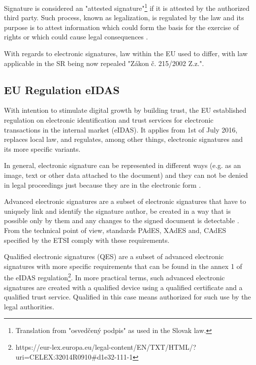 \documentclass[thesismargins, english, thesislinespacing, twoside, openright, upjsfrontpage]{rnthesis}
\begin{document}
Signature is considered an "attested signature"\footnote{Translation from "osvedčený podpis" as used in the Slovak law.} if it is attested by the authorized third party.
Such process, known as legalization, is regulated by the law and its purpose is to attest information which could form the basis for the exercise of rights or which could cause legal consequences \cite{3}.

With regards to electronic signatures, law within the EU used to differ, with law applicable in the SR being now repealed "Zákon č. 215/2002 Z.z.".

\subsection{EU Regulation eIDAS}

With intention to stimulate digital growth by building trust, the EU established regulation on electronic identification and trust services for electronic transactions in the internal market (eIDAS).
It applies from 1st of July 2016, replaces local law, and regulates, among other things, electronic signatures and its more specific variants.


In general, electronic signature can be represented in different ways (e.g. as an image, text or other data attached to the document) and they can not be denied in legal proceedings just because they are in the electronic form \cite{4}.

Advanced electronic signatures are a subset of electronic signatures that have to uniquely link and identify the signature author, be created in a way that is possible only by them and any changes to the signed document is detectable \cite{5}.
From the technical point of view, standards PAdES, XAdES and, CAdES specified by the ETSI comply with these requirements.

Qualified electronic signatures (QES) are a subset of advanced electronic signatures with more specific requirements that can be found in the annex 1 of the eIDAS regulation\footnote{https://eur-lex.europa.eu/legal-content/EN/TXT/HTML/?uri=CELEX:32014R0910\#d1e32-111-1}.
In more practical terms, such advanced electronic signatures are created with a qualified device using a qualified certificate and a qualified trust service. Qualified in this case means authorized for such use by the legal authorities.
\end{document}
